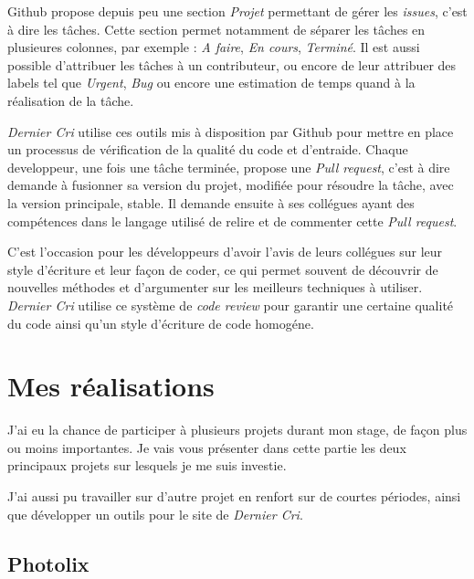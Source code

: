 \bigskip

Github propose depuis peu une section \emph{Projet} permettant de gérer
les \emph{issues}, c'est à dire les tâches. Cette section permet
notamment de séparer les tâches en plusieures colonnes, par exemple :
\emph{A faire}, \emph{En cours}, \emph{Terminé}. Il est aussi possible
d'attribuer les tâches à un contributeur, ou encore de leur attribuer
des labels tel que \emph{Urgent}, \emph{Bug} ou encore une estimation de
temps quand à la réalisation de la tâche.

\bigskip

\emph{Dernier Cri} utilise ces outils mis à disposition par Github pour
mettre en place un processus de vérification de la qualité du code et
d'entraide. Chaque developpeur, une fois une tâche terminée, propose une
\emph{Pull request}, c'est à dire demande à fusionner sa version du
projet, modifiée pour résoudre la tâche, avec la version principale,
stable. Il demande ensuite à ses collégues ayant des compétences dans le
langage utilisé de relire et de commenter cette \emph{Pull request}.

\bigskip

C'est l'occasion pour les développeurs d'avoir l'avis de leurs collégues
sur leur style d'écriture et leur façon de coder, ce qui permet souvent
de découvrir de nouvelles méthodes et d'argumenter sur les meilleurs
techniques à utiliser. \emph{Dernier Cri} utilise ce système de
\emph{code review} pour garantir une certaine qualité du code ainsi
qu'un style d'écriture de code homogéne.

\bigskip

\section{Mes réalisations}\label{mes-ruxe9alisations}

\bigskip

J'ai eu la chance de participer à plusieurs projets durant mon stage, de
façon plus ou moins importantes. Je vais vous présenter dans cette
partie les deux principaux projets sur lesquels je me suis investie.

\bigskip

J'ai aussi pu travailler sur d'autre projet en renfort sur de courtes
périodes, ainsi que développer un outils pour le site de \emph{Dernier
Cri}.

\bigskip

\subsection{Photolix}\label{photolix}

